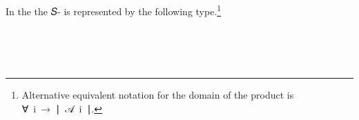 
In the \ualib the  \ab 𝑆- is represented by the following type.\footnote{Alternative equivalent notation for the domain of the product is \as ∀~\ab i~\as →~\af ∣~\ab 𝒜~\ab i~\af ∣.}
\ccpad
\begin{code}%
\>[0][@{}l@{\AgdaIndent{0}}]%
\>[1]\AgdaSpace{}%
\AgdaSymbol{:}\AgdaSpace{}%
\AgdaSymbol{(}\AgdaSpace{}%
\AgdaSymbol{:}\AgdaSpace{}%
\AgdaSpace{}%
\AgdaSpace{}%
\AgdaSpace{}%
\AgdaSpace{}%
\AgdaSpace{}%
\AgdaSymbol{)}\AgdaSpace{}%
\AgdaSpace{}%
\AgdaSpace{}%
\AgdaSymbol{(}\AgdaSpace{}%
\AgdaSpace{}%
\AgdaSymbol{)}\AgdaSpace{}%
\<%
\\
%
\\[\AgdaEmptyExtraSkip]%
%
\>[1]\AgdaSpace{}%
\AgdaSpace{}%
\AgdaSymbol{=}%
\>[51I]\AgdaSymbol{(}\AgdaSpace{}%
\AgdaSpace{}%
\AgdaSpace{}%
\AgdaSpace{}%
\AgdaFunction{,}\AgdaSpace{}%
\AgdaSpace{}%
\AgdaSpace{}%
\AgdaSpace{}%
\AgdaSymbol{)}\AgdaSpace{}%
\AgdaOperator{\AgdaInductiveConstructor{,}}%
\>[43]\<%
\\
\>[.][@{}l@{}]\<[51I]%
\>[7]\AgdaSpace{}%
\AgdaSpace{}%
\AgdaSpace{}%
\AgdaSpace{}%
\AgdaSpace{}%
\AgdaSymbol{(}\AgdaSpace{}%
\AgdaSpace{}%
\AgdaSpace{}%
\AgdaSymbol{)}\AgdaSpace{}%
\AgdaSpace{}%
\AgdaSpace{}%
\AgdaSpace{}%
\AgdaSpace{}%
\AgdaSpace{}%
%
\>[43]\<%
\end{code}
